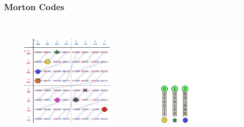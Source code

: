 \documentclass{beamer}
\begin{document}
\begin{frame}
  \frametitle{Morton Codes}
  
\begin{columns}[t]

\begin{figure}
\includegraphics[height=55mm]{Z-curve-primitives.png}
\end{figure}

\begin{figure}
\includegraphics[height=55mm]{keys_2.png}
\end{figure}
\end{columns}
\end{frame}
\end{document}

